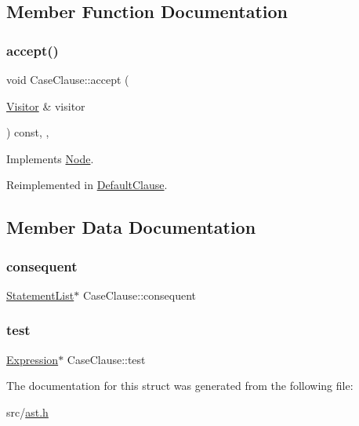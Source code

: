\subsection{Member Function Documentation}
\mbox{\label{struct_case_clause_a5bbee9ea9ca206c09b8b79f8c96720a1}} 
\subsubsection{\texorpdfstring{accept()}{accept()}}
{\footnotesize\ttfamily void Case\+Clause\+::accept (\begin{DoxyParamCaption}\item[{\hyperlink{struct_visitor}{Visitor} \&}]{visitor }\end{DoxyParamCaption}) const\hspace{0.3cm}{\ttfamily [inline]}, {\ttfamily [override]}, {\ttfamily [virtual]}}



Implements \hyperlink{struct_node_a10bd7af968140bbf5fa461298a969c71}{Node}.



Reimplemented in \hyperlink{struct_default_clause_ade62e79cf9ad891d974528e1e172e2b6}{Default\+Clause}.



\subsection{Member Data Documentation}
\mbox{\label{struct_case_clause_a3e6914411610d1893b61172521e11288}} 
\subsubsection{\texorpdfstring{consequent}{consequent}}
{\footnotesize\ttfamily \hyperlink{struct_statement_list}{Statement\+List}$\ast$ Case\+Clause\+::consequent}

\mbox{\label{struct_case_clause_a80b6f256f3d9910250e4b8433ea75d7f}} 
\subsubsection{\texorpdfstring{test}{test}}
{\footnotesize\ttfamily \hyperlink{struct_expression}{Expression}$\ast$ Case\+Clause\+::test}



The documentation for this struct was generated from the following file\+:\begin{DoxyCompactItemize}
\item 
src/\hyperlink{ast_8h}{ast.\+h}\end{DoxyCompactItemize}
